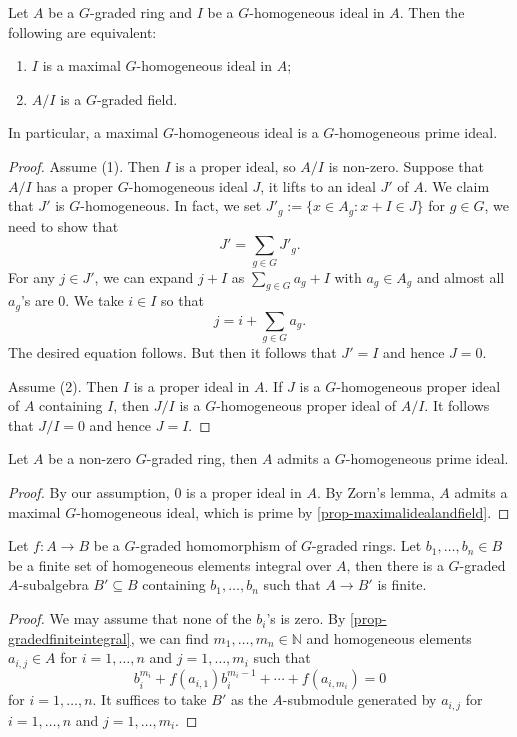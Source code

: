 \begin{proposition}\label{prop-maximalidealandfield}
    Let $A$ be a $G$-graded ring and $I$ be a $G$-homogeneous ideal in $A$. Then the following are equivalent:
    \begin{enumerate}
        \item $I$ is a maximal $G$-homogeneous ideal in $A$;
        \item $A/I$ is a $G$-graded field.
    \end{enumerate}

    In particular, a maximal $G$-homogeneous ideal is a $G$-homogeneous prime ideal.
\end{proposition}
\begin{proof}
    Assume (1). Then $I$ is a proper ideal, so $A/I$ is non-zero. Suppose that $A/I$ has a proper $G$-homogeneous ideal $J$, it lifts to an ideal $J'$ of $A$. We claim that $J'$ is $G$-homogeneous. In fact, we set $J'_g:=\{x\in A_g: x+I\in J\}$ for $g\in G$, we need to show that
    \[
        J'=\sum_{g\in G}  J'_g.
    \]
    For any $j\in J'$, we can expand $j+I$ as $\sum_{g\in G} a_g+I$ with $a_g\in A_g$ and almost all $a_g$'s are $0$. We take $i\in I$ so that 
    \[
        j=i+\sum_{g\in G} a_g.  
    \]
    The desired equation follows.
    But then it follows that $J'=I$ and hence $J=0$.

    Assume (2). Then $I$ is a proper ideal in $A$. If $J$ is a $G$-homogeneous proper ideal of $A$ containing $I$, then $J/I$ is a $G$-homogeneous proper ideal of $A/I$. It follows that $J/I=0$ and hence $J=I$.
\end{proof}
\begin{corollary}\label{cor-specgradednonempty}
    Let $A$ be a non-zero $G$-graded ring, then $A$ admits a $G$-homogeneous prime ideal.
\end{corollary}
\begin{proof}
    By our assumption, $0$ is a proper ideal in $A$.
    By Zorn's lemma, $A$ admits a maximal $G$-homogeneous ideal, which is prime by \cref{prop-maximalidealandfield}.
\end{proof}

\begin{lemma}\label{lma-integralelementscontinfinitemodule}
    Let $f:A\rightarrow B$ be a $G$-graded homomorphism of $G$-graded rings. Let $b_1,\ldots,b_n\in B$ be a finite set of homogeneous elements integral over $A$, then there is a $G$-graded $A$-subalgebra $B'\subseteq B$ containing $b_1,\ldots,b_n$ such that $A\rightarrow B'$ is finite.
\end{lemma}
\begin{proof}
    We may assume that none of the $b_i$'s is zero.
    By \cref{prop-gradedfiniteintegral}, we can find $m_1,\ldots,m_n\in \mathbb{N}$ and homogeneous elements $a_{i,j}\in A$ for $i=1,\ldots,n$ and $j=1,\ldots,m_i$ such that
    \[
        b_i^{m_i}+f(a_{i,1})  b_i^{m_i-1}+\cdots+f(a_{i,m_i})=0
    \]
    for $i=1,\ldots,n$. It suffices to take $B'$ as the $A$-submodule generated by $a_{i,j}$ for $i=1,\ldots,n$ and $j=1,\ldots,m_i$.
\end{proof}

